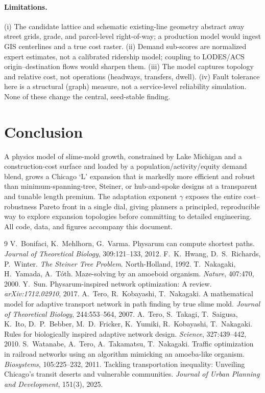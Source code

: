 \documentclass[11pt]{article}
\begin{document}
\paragraph{Limitations.} (i) The candidate lattice and schematic existing-line geometry
abstract away street grids, grade, and parcel-level right-of-way; a production model would
ingest GIS centerlines and a true cost raster. (ii) Demand sub-scores are normalized expert
estimates, not a calibrated ridership model; coupling to LODES/ACS origin--destination flows
would sharpen them. (iii) The model captures topology and relative cost, not operations
(headways, transfers, dwell). (iv) Fault tolerance here is a structural (graph) measure, not a
service-level reliability simulation. None of these change the central, seed-stable finding.

\section{Conclusion}
A physics model of slime-mold growth, constrained by Lake Michigan and a construction-cost
surface and loaded by a population/activity/equity demand blend, grows a Chicago `L' expansion
that is markedly more efficient and robust than minimum-spanning-tree, Steiner, or hub-and-spoke
designs at a transparent and tunable length premium. The adaptation exponent $\gamma$ exposes the
entire cost--robustness Pareto front in a single dial, giving planners a principled, reproducible
way to explore expansion topologies before committing to detailed engineering. All code, data,
and figures accompany this document.

\small
\begin{thebibliography}{9}
 V.~Bonifaci, K.~Mehlhorn, G.~Varma.
Physarum can compute shortest paths. \emph{Journal of Theoretical Biology}, 309:121--133, 2012.
 F.~K.~Hwang, D.~S.~Richards, P.~Winter.
\emph{The Steiner Tree Problem}. North-Holland, 1992.
 T.~Nakagaki, H.~Yamada, A.~T\'oth.
Maze-solving by an amoeboid organism. \emph{Nature}, 407:470, 2000.
 Y.~Sun. Physarum-inspired network optimization: A review.
\emph{arXiv:1712.02910}, 2017.
 A.~Tero, R.~Kobayashi, T.~Nakagaki.
A mathematical model for adaptive transport network in path finding by true slime mold.
\emph{Journal of Theoretical Biology}, 244:553--564, 2007.
 A.~Tero, S.~Takagi, T.~Saigusa, K.~Ito, D.~P.~Bebber,
M.~D.~Fricker, K.~Yumiki, R.~Kobayashi, T.~Nakagaki. Rules for biologically inspired adaptive
network design. \emph{Science}, 327:439--442, 2010.
 S.~Watanabe, A.~Tero, A.~Takamatsu, T.~Nakagaki.
Traffic optimization in railroad networks using an algorithm mimicking an amoeba-like organism.
\emph{Biosystems}, 105:225--232, 2011.
 Tackling transportation inequality:
Unveiling Chicago's transit deserts and vulnerable communities. \emph{Journal of Urban Planning
and Development}, 151(3), 2025.
\end{thebibliography}
\end{document}
